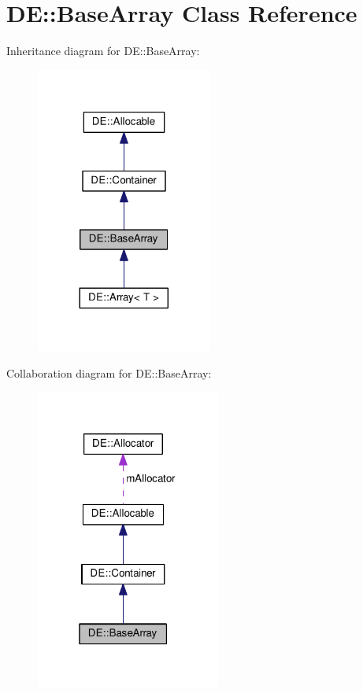 \hypertarget{classDE_1_1BaseArray}{}\section{DE\+:\+:Base\+Array Class Reference}
\label{classDE_1_1BaseArray}


Inheritance diagram for DE\+:\+:Base\+Array\+:
\nopagebreak
\begin{figure}[H]
\begin{center}
\leavevmode
\includegraphics[width=164pt]{classDE_1_1BaseArray__inherit__graph}
\end{center}
\end{figure}


Collaboration diagram for DE\+:\+:Base\+Array\+:
\nopagebreak
\begin{figure}[H]
\begin{center}
\leavevmode
\includegraphics[width=172pt]{classDE_1_1BaseArray__coll__graph}
\end{center}
\end{figure}
